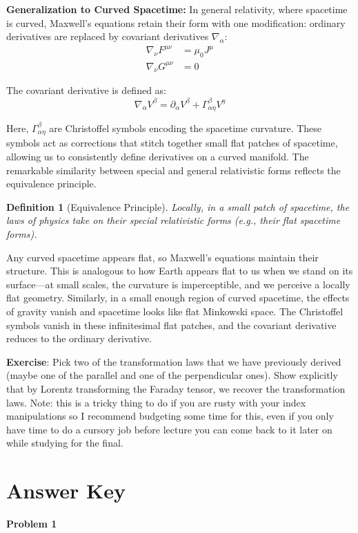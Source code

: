\documentclass{article}
\newtheorem{definition}{Definition}
\begin{document}
\textbf{Generalization to Curved Spacetime:} In general relativity, where spacetime is curved, Maxwell's equations retain their form with one modification: ordinary derivatives are replaced by covariant derivatives $\nabla_\alpha$:
\begin{align*}
\nabla_\nu F^{\mu\nu} &= \mu_0 J^\mu \\
\nabla_\nu G^{\mu\nu} &= 0
\end{align*}

The covariant derivative is defined as:
\[\nabla_\alpha V^\beta = \partial_\alpha V^\beta + \Gamma_{\alpha\eta}^\beta V^\eta\]

Here, $\Gamma_{\alpha\eta}^\beta$ are Christoffel symbols encoding the spacetime curvature. These symbols act as corrections that stitch together small flat patches of spacetime, allowing us to consistently define derivatives on a curved manifold. The remarkable similarity between special and general relativistic forms reflects the equivalence principle.
\begin{definition}[Equivalence Principle]
    Locally, in a small patch of spacetime, the laws of physics take on their special relativistic forms (e.g., their flat spacetime forms).
\end{definition}    
Any curved spacetime appears flat, so Maxwell's equations maintain their structure. This is analogous to how Earth appears flat to us when we stand on its surface---at small scales, the curvature is imperceptible, and we perceive a locally flat geometry. Similarly, in a small enough region of curved spacetime, the effects of gravity vanish and spacetime looks like flat Minkowski space. The Christoffel symbols vanish in these infinitesimal flat patches, and the covariant derivative reduces to the ordinary derivative.
\\\par
\textbf{Exercise}: Pick two of the transformation laws that we have previously derived (maybe one of the parallel and one of the perpendicular ones). Show explicitly that by Lorentz transforming the Faraday tensor, we recover the transformation laws. Note: this is a tricky thing to do if you are rusty with your index manipulations so I recommend budgeting some time for this, even if you only have time to do a cursory job before lecture you can come back to it later on while studying for the final.

\section{Answer Key}
\textbf{Problem 1}
\end{document}

